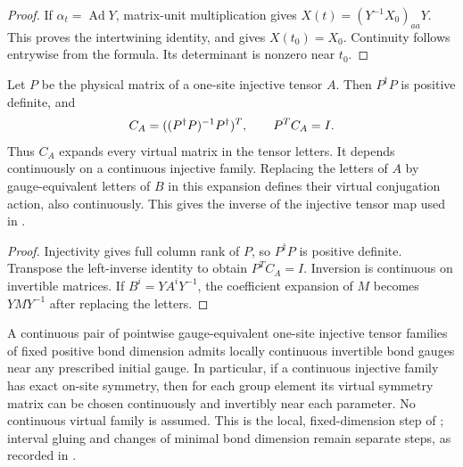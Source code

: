 \begin{proof}\leanok
    If $\alpha_t=\operatorname{Ad}Y$, matrix-unit multiplication gives
    $X(t)=(Y^{-1}X_0)_{aa}Y$. This proves the intertwining identity,
    and gives $X(t_0)=X_0$. Continuity follows entrywise from the
    formula. Its determinant is nonzero near $t_0$.
\end{proof}

\begin{lemma}
    \label{thm:spt_continuous_inverse_coefficients}
    \leanok
    Let $P$ be the physical matrix of a one-site injective tensor $A$.
    Then $P^\dagger P$ is positive definite, and
    \begin{align}
        C_A=((P^\dagger P)^{-1}P^\dagger)^T,
        \qquad P^T C_A=I.
        \notag
    \end{align}
    Thus $C_A$ expands every virtual matrix in the tensor letters.
    It depends continuously on a continuous injective family.
    Replacing the letters of $A$ by gauge-equivalent letters of $B$
    in this expansion defines their virtual conjugation action,
    also continuously. This gives the inverse of the injective
    tensor map used in \cite[Section~II.F.2]{Schuch2011Phases}.
\end{lemma}

\begin{proof}\leanok
    Injectivity gives full column rank of $P$, so $P^\dagger P$ is
    positive definite. Transpose the left-inverse identity to obtain
    $P^TC_A=I$. Inversion is continuous on invertible matrices.
    If $B^i=YA^iY^{-1}$, the coefficient expansion of $M$ becomes
    $YMY^{-1}$ after replacing the letters.
\end{proof}

\begin{lemma}
    \label{thm:spt_local_virtual_gauge}
    \leanok

    A continuous pair of pointwise gauge-equivalent one-site injective
    tensor families of fixed positive bond dimension admits locally
    continuous invertible bond gauges near any prescribed initial gauge.
    In particular, if a continuous injective family has exact on-site
    symmetry, then for each group element its virtual symmetry matrix
    can be chosen continuously and invertibly near each parameter.
    No continuous virtual family is assumed.
    This is the local, fixed-dimension step of
    \cite[Section~II.F.2]{Schuch2011Phases}; interval gluing and changes
    of minimal bond dimension remain separate steps, as recorded in
    \cite{gap:spc11_spt_interpolation_upper_range}.
\end{lemma}

